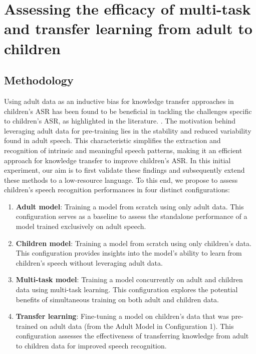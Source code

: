 \section{Assessing the efficacy of multi-task and transfer learning from adult to children}
\label{section:HMMDNNADULT2CHILD}
\subsection{Methodology}

Using adult data as an inductive bias for knowledge transfer approaches in children's ASR has been found to be beneficial in tackling the challenges specific to children's ASR, as highlighted in the literature. \cite{TFchildren,TransferLF,2019multi}. The motivation behind leveraging adult data for pre-training lies in the stability and reduced variability found in adult speech. This characteristic simplifies the extraction and recognition of intrinsic and meaningful speech patterns, making it an efficient approach for knowledge transfer to improve children's \ac{ASR}. In this initial experiment, our aim is to first validate these findings and subsequently extend these methods to a low-resource language. To this end, we propose to assess children's speech recognition performances in four distinct configurations:



\begin{enumerate}
    \item \textbf{Adult model}: Training a model from scratch using only adult data. This configuration serves as a baseline to assess the standalone performance of a model trained exclusively on adult speech.
    \item \textbf{Children model}: Training a model from scratch using only children's data. This configuration provides insights into the model's ability to learn from children's speech without leveraging adult data.
    \item \textbf{Multi-task model}: Training a model concurrently on adult and children data using multi-task learning. This configuration explores the potential benefits of simultaneous training on both adult and children data.
    \item \textbf{Transfer learning}: Fine-tuning a model on children's data that was pre-trained on adult data (from the Adult Model in Configuration 1). This configuration assesses the effectiveness of transferring knowledge from adult to children data for improved speech recognition.
\end{enumerate}

